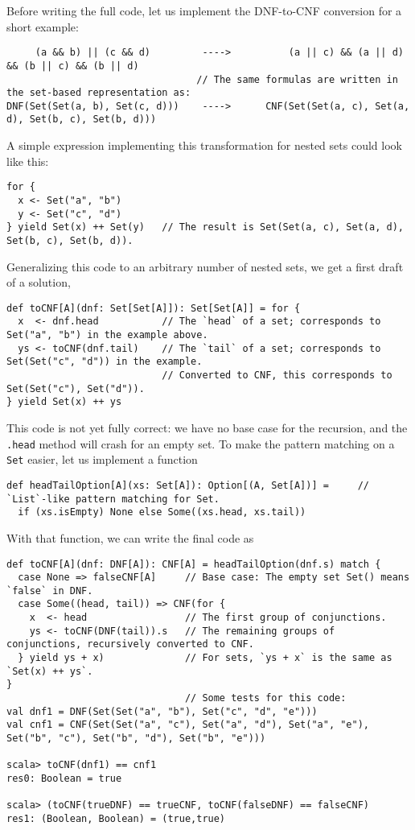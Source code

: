 Before writing the full code, let us implement the DNF-to-CNF conversion
for a short example: 
\begin{lstlisting}
     (a && b) || (c && d)         ---->          (a || c) && (a || d) && (b || c) && (b || d)
                                 // The same formulas are written in the set-based representation as:
DNF(Set(Set(a, b), Set(c, d)))    ---->      CNF(Set(Set(a, c), Set(a, d), Set(b, c), Set(b, d)))
\end{lstlisting}
A simple expression implementing this transformation for nested sets
could look like this: 
\begin{lstlisting}
for {
  x <- Set("a", "b")
  y <- Set("c", "d")
} yield Set(x) ++ Set(y)   // The result is Set(Set(a, c), Set(a, d), Set(b, c), Set(b, d)).
\end{lstlisting}
Generalizing this code to an arbitrary number of nested sets, we get
a first draft of a solution,
\begin{lstlisting}
def toCNF[A](dnf: Set[Set[A]]): Set[Set[A]] = for {
  x  <- dnf.head           // The `head` of a set; corresponds to Set("a", "b") in the example above.
  ys <- toCNF(dnf.tail)    // The `tail` of a set; corresponds to Set(Set("c", "d")) in the example.
                           // Converted to CNF, this corresponds to Set(Set("c"), Set("d")).
} yield Set(x) ++ ys  
\end{lstlisting}
This code is not yet fully correct: we have no base case for the recursion,
and the \lstinline!.head! method will crash for an empty set. To
make the pattern matching on a \lstinline!Set! easier, let us implement
a function
\begin{lstlisting}
def headTailOption[A](xs: Set[A]): Option[(A, Set[A])] =     // `List`-like pattern matching for Set.
  if (xs.isEmpty) None else Some((xs.head, xs.tail))
\end{lstlisting}
With that function, we can write the final code as
\begin{lstlisting}
def toCNF[A](dnf: DNF[A]): CNF[A] = headTailOption(dnf.s) match {
  case None => falseCNF[A]     // Base case: The empty set Set() means `false` in DNF.
  case Some((head, tail)) => CNF(for {
    x  <- head                 // The first group of conjunctions.
    ys <- toCNF(DNF(tail)).s   // The remaining groups of conjunctions, recursively converted to CNF.
  } yield ys + x)              // For sets, `ys + x` is the same as `Set(x) ++ ys`.
}
                               // Some tests for this code:
val dnf1 = DNF(Set(Set("a", "b"), Set("c", "d", "e")))
val cnf1 = CNF(Set(Set("a", "c"), Set("a", "d"), Set("a", "e"), Set("b", "c"), Set("b", "d"), Set("b", "e")))

scala> toCNF(dnf1) == cnf1
res0: Boolean = true 

scala> (toCNF(trueDNF) == trueCNF, toCNF(falseDNF) == falseCNF)
res1: (Boolean, Boolean) = (true,true)
\end{lstlisting}
